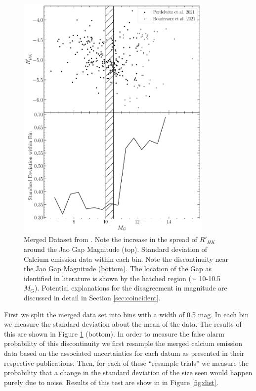 \begin{figure}
  \centering
  \includegraphics[width=0.85\textwidth]{figures/jaoMagActivity/CombinedDeviation.pdf}
  \caption{Merged Dataset from \citet{Perdelwitz2021, Boudreaux2022}. Note the
  increase in the spread of $R'_{HK}$ around the Jao Gap Magnitude (top).
  Standard deviation of Calcium emission data within each bin. Note the
  discontinuity near the Jao Gap Magnitude (bottom). The location of the Gap
  as identified in literature is shown by the hatched region ($\sim$ 10-10.5 $M_{G}$). Potential
  explanations for the disagreement in magnitude are discussed in detail
  in Section \ref{sec:coincident}.}
  \label{fig:initData}
\end{figure}

First we split the merged data set into bins with a width of 0.5 mag. In each bin we
measure the standard deviation about the mean of the data. The results of this
are shown in Figure \ref{fig:initData} (bottom). In order to measure the false alarm
probability of this discontinuity we first resample the merged calcium
emission data based on the associated uncertainties for each datum as
presented in their respective publications. Then, for each of these ``resample
trials'' we measure the probability that a change in the standard deviation of
the size seen would happen purely due to noise. Results of this test are show in
in Figure \ref{fig:dist}. 

